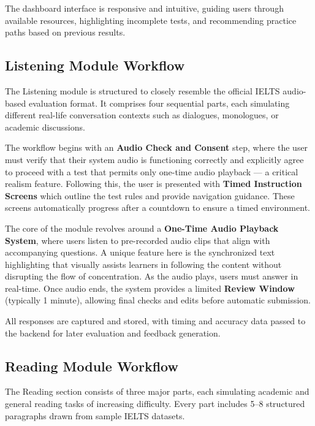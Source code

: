 \documentclass[a4paper,12pt]{article}
\begin{document}
The dashboard interface is responsive and intuitive, guiding users through available resources, highlighting incomplete tests, and recommending practice paths based on previous results.

\vspace{0.5cm}

\subsection{Listening Module Workflow}

The Listening module is structured to closely resemble the official IELTS audio-based evaluation format. It comprises four sequential parts, each simulating different real-life conversation contexts such as dialogues, monologues, or academic discussions.

The workflow begins with an \textbf{Audio Check and Consent} step, where the user must verify that their system audio is functioning correctly and explicitly agree to proceed with a test that permits only one-time audio playback — a critical realism feature. Following this, the user is presented with \textbf{Timed Instruction Screens} which outline the test rules and provide navigation guidance. These screens automatically progress after a countdown to ensure a timed environment.

The core of the module revolves around a \textbf{One-Time Audio Playback System}, where users listen to pre-recorded audio clips that align with accompanying questions. A unique feature here is the synchronized text highlighting that visually assists learners in following the content without disrupting the flow of concentration. As the audio plays, users must answer in real-time. Once audio ends, the system provides a limited \textbf{Review Window} (typically 1 minute), allowing final checks and edits before automatic submission.

All responses are captured and stored, with timing and accuracy data passed to the backend for later evaluation and feedback generation.

\vspace{0.5cm}

\subsection{Reading Module Workflow}

The Reading section consists of three major parts, each simulating academic and general reading tasks of increasing difficulty. Every part includes 5–8 structured paragraphs drawn from sample IELTS datasets.
\end{document}
